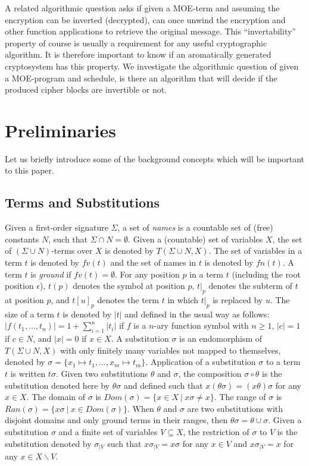 \documentclass{easychair}
\begin{document}
A related algorithmic question asks if given a MOE-term and assuming
the encryption can be inverted (decrypted), can once unwind the 
encryption and other function applications to retrieve the 
original message. This ``invertability'' property of course 
is usually a requirement for any useful cryptographic algorithm.
It is therefore important to know if an aromatically generated cryptosystem has this property. We investigate the algorithmic 
question of given a MOE-program and schedule, is there an algorithm that will decide if the produced cipher blocks are invertible or not.        
   
 
\section{Preliminaries}
Let us briefly introduce some of the background concepts which will be important to this paper. 
\subsection{Terms and Substitutions}
Given a first-order signature $\Sigma$, a set of {\em names} is a
countable set of (free) constants $N$, such that $\Sigma \cap N =
\emptyset$.  Given a (countable) set of variables $X$, the set of
$(\Sigma \cup N)$-terms over $X$ is denoted by $T(\Sigma \cup N,X)$.
The set of variables in a term $t$ is denoted by $fv(t)$ and the set
of names in $t$ is denoted by $fn(t)$.  A term $t$ is \emph{ground} if
$fv(t) = \emptyset$.  For any position $p$ in a term $t$ (including
the root position $\epsilon$), $t(p)$ denotes the symbol at position
$p$, $t|_p$ denotes the subterm of $t$ at position $p$, and $t[u]_p$
denotes the term $t$ in which $t|_p$ is replaced by $u$.
The size of a term $t$ is denoted by $|t|$ and defined in the usual
way as follows: $|f(t_1,\dots,t_n)| = 1 + \sum_{i=1}^n |t_i|$ if $f$
is a $n$-ary function symbol with $n\geq 1$, $|c| = 1$ if $c \in N$, and $|x| = 0$ if $x \in X$.
A substitution $\sigma$ is an endomorphism of $T(\Sigma \cup N,X)$ with only finitely many variables not mapped to themselves, denoted by
$\sigma= \{ x_1 \mapsto t_1, \dots, x_m \mapsto t_m \}$. 
Application of a substitution $\sigma$ to a term $t$ is written $t\sigma$.
Given two substitutions $\theta$ and $\sigma$, the composition $\sigma \circ \theta$ is the substitution denoted here by $\theta\sigma$ and defined such that $x(\theta\sigma) = (x\theta)\sigma$ for any $x \in X$. 
The domain of $\sigma$ is $Dom(\sigma) = \{ x \in X ~|~ x\sigma \neq x \}$. The range of $\sigma$ is $Ran(\sigma) = \{ x\sigma ~|~ x \in Dom(\sigma) \}$. When $\theta$ and $\sigma$ are two substitutions with disjoint domains and only ground terms in their ranges, then $\theta\sigma = \theta \cup \sigma$.
Given a substitution $\sigma$ and a finite set of variables $V \subseteq X$, the restriction of $\sigma$ to $V$ is the substitution denoted by $\sigma_{| V}$ such that $x\sigma_{| V} = x \sigma$ for any $x \in V$ and $x\sigma_{| V} = x$ for any $x \in X \backslash V$.
\end{document}
